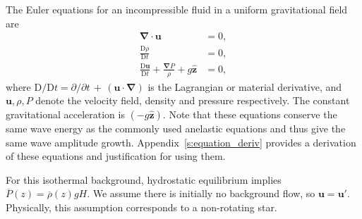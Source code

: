 \documentclass[
        fleqn,
        usenatbib,
    ]{mnras}
\newcommand*{\mdil}[2]{\mathrm{D}#1/\mathrm{D}#2}
\newcommand*{\pdil}[2]{\partial#1/\partial#2}
\newcommand*{\md}[2]{\frac{\mathrm{D}#1}{\mathrm{D}#2}}
\newcommand*{\p}[1]{\left(#1\right)}
\newcommand*{\bm}[1]{\mathbf{#1}}
\newcommand*{\uv}[1]{\hat{\mathbf{#1}}}
\begin{document}
The Euler equations for an incompressible fluid in a uniform gravitational field
are
\begin{subequations}\label{se:nl_orig}
    \begin{align}
        \bm{\nabla} \cdot \bm{u} &= 0,\label{eq:nl_incomp}\\
        \md{\rho}{t} &= 0 ,\label{eq:nl_density}\\
        \md{\bm{u}}{t} + \frac{\bm{\nabla}P}{\rho} + g\uv{z} &=
            0\label{eq:nl_mom},
    \end{align}
\end{subequations}
where $\mdil{}{t} = \pdil{}{t}\,+\,\p{\bm{u} \cdot \bm{\nabla}}$ is the
Lagrangian or material derivative, and $\bm{u}, \rho, P$ denote the velocity
field, density and pressure respectively. The constant gravitational
acceleration is $(-g\uv{z})$. \textcolor{Corr}{Note that these equations
conserve the same wave energy as the commonly used anelastic equations
\citep{ogura1962scale,anel_part1} and thus give the same wave amplitude
growth. Appendix~\ref{s:equation_deriv} provides a derivation of these
equations and justification for using them.}

For this isothermal background, hydrostatic equilibrium implies
\textcolor{Corr}{$\overline{P}(z) = \overline{\rho}(z) g H$}. We assume there is
initially no background flow, so $\bm{u} = \bm{u}'$. Physically, this assumption
corresponds to a non-rotating star.
\end{document}
